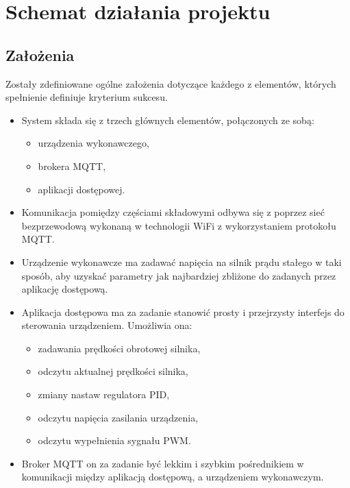 
  \chapter{Schemat działania projektu}
  
    \section{Założenia}

    Zostały zdefiniowane ogólne założenia dotyczące każdego z elementów, których spełnienie definiuje kryterium sukcesu.
    
    \begin{itemize}
        \item    System składa się z trzech głównych elementów, połączonych ze sobą:
            \begin{itemize}
                \item urządzenia wykonawczego,
                \item brokera MQTT,
                \item aplikacji dostępowej.
            \end{itemize}
            
        \item     Komunikacja pomiędzy częściami składowymi odbywa się z poprzez sieć bezprzewodową wykonaną w technologii WiFi z wykorzystaniem protokołu MQTT.
        \item     Urządzenie wykonawcze ma zadawać napięcia na silnik prądu stałego w taki sposób, aby uzyskać parametry jak najbardziej zbliżone do zadanych przez aplikację dostępową.   
        \item    Aplikacja dostępowa ma za zadanie stanowić prosty i przejrzysty interfejs do sterowania urządzeniem. Umożliwia ona:
    
            \begin{itemize}
                \item zadawania prędkości obrotowej silnika,
                \item odczytu aktualnej prędkości silnika,
                \item zmiany nastaw regulatora PID,
                \item odczytu napięcia zasilania urządzenia,
                \item odczytu wypełnienia sygnału PWM.
            \end{itemize}
            
        \item    Broker MQTT on za zadanie być lekkim i szybkim pośrednikiem w komunikacji między aplikacją dostępową, a urządzeniem wykonawczym.
    \end{itemize}
 

